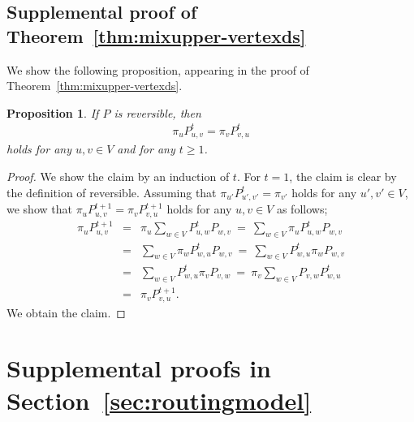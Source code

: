 \documentclass[letter, 11pt]{article}
\newcommand{\1}{\mbox{1}\hspace{-0.25em}\mbox{l}}
\newtheorem{proposition}[theorem]{Proposition}
\begin{document}
\subsection{Supplemental proof of Theorem~\ref{thm:mixupper-vertexds}}
We show the following proposition, appearing in the proof of Theorem~\ref{thm:mixupper-vertexds}.  
\begin{proposition}
\label{prop:reversible}
If $P$ is reversible, then 
\begin{eqnarray*}
 \pi_uP^t_{u, v}=\pi_vP^t_{v, u}
\end{eqnarray*}
holds for any $u, v\in V$ and for any $t\geq 1$. 
\end{proposition}
\begin{proof}
 We show the claim by an induction of $t$. 
 For $t=1$, the claim is clear by the definition of reversible. 
 Assuming that $\pi_{u'}P^t_{u', v'}=\pi_{v'}$ holds for any $u', v'\in V$, 
 we show that $\pi_uP^{t+1}_{u, v}=\pi_vP^{t+1}_{v, u}$ holds for any $u, v\in V$ as follows;  
\begin{eqnarray*}
\pi_uP^{t+1}_{u, v}
&=&  \pi_u\sum_{w \in V}P^t_{u, w}P_{w, v}
\ =\ \sum_{w \in V}\pi_uP^t_{u, w}P_{w, v} \\
&=&  \sum_{w \in V}\pi_w P^t_{w, u}P_{w, v}
\ =\ \sum_{w \in V}P^t_{w, u} \pi_wP_{w, v}\\
&=&  \sum_{w \in V}P^t_{w, u} \pi_v P_{v, w}
\ =\ \pi_v \sum_{w \in V} P_{v, w}P^t_{w, u} \\
&=& \pi_vP^{t+1}_{v, u}. 
\end{eqnarray*}
We obtain the claim.
\end{proof}

\section{Supplemental proofs in Section~\ref{sec:routingmodel}}
\end{document}
